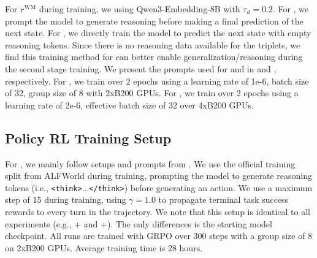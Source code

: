 For $r^{\textrm{WM}}$ during training, we using Qwen3-Embedding-8B \citep{zhang2025qwen3embeddingadvancingtext} with $\tau_{d}=0.2$.
For \wmrlshort{}, we prompt the model to generate reasoning before making a final prediction of the next state. For \wmsftshort{}, we directly train the model to predict the next state with empty reasoning tokens.
Since there is no reasoning data available for the triplets, we find this training method for \wmsftshort{} can better enable generalization/reasoning during the second stage \policyrl{} training.
We present the prompts used for \wmrlshort{} and \wmsftshort{} in  and , respectively.
For \wmrlshort{}, we train over 2 epochs using a learning rate of 1e-6, batch size of 32, group size of 8 with 2xB200 GPUs. For \wmsftshort{}, we train over 2 epochs using a learning rate of 2e-6, effective batch size of 32 over 4xB200 GPUs.



\subsection{Policy RL Training Setup}
\label{subsec:alfworld_policy_rl_setup}
For \policyrl{}, we mainly follow setups and prompts from \citet{feng2025groupingrouppolicyoptimizationllm,yu2025dynamindlearningsimulateexperience}.
We use the official training split from ALFWorld during training, prompting the model to generate reasoning tokens (i.e., \texttt{<think>}...\texttt{</think>}) before generating an action.
We use a maximum step of 15 during training, using $\gamma=1.0$ to propagate terminal task success rewards to every turn in the trajectory.
We note that this setup is identical to all \policyrl{} experiments (e.g., \wmrlshort{}+\policyrl{} and \wmsftshort{}+\policyrl{}). The only differences is the starting model checkpoint.
All \policyrl{} runs are trained with GRPO over 300 steps with a group size of 8 on 2xB200 GPUs. Average training time is 28 hours.

